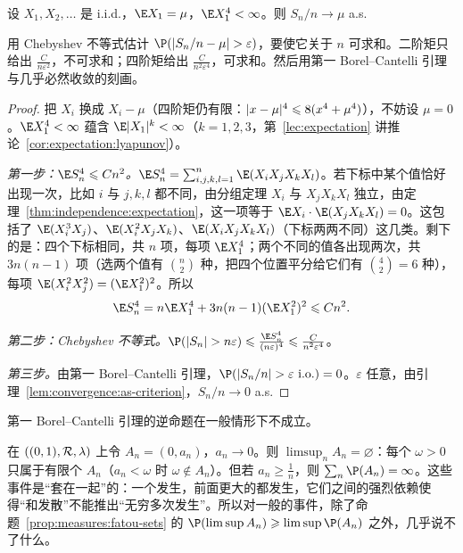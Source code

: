 \begin{theorem}[四阶矩的强大数定律]\label{thm:borel-cantelli:fourth-moment}
设 $X_1,X_2,\dots$ 是 i.i.d.，$\E X_1=\mu$，$\E X_1^4<\infty$。则 $S_n/n\to\mu$ a.s.
\end{theorem}

\begin{remark}[证明思路]
用 Chebyshev 不等式估计 $\P(\abs{S_n/n-\mu}>\varepsilon)$，要使它关于 $n$ 可求和。二阶矩只给出 $\frac C{n\varepsilon^2}$，不可求和；四阶矩给出 $\frac C{n^2\varepsilon^4}$，可求和。然后用第一 Borel--Cantelli 引理与几乎必然收敛的刻画。
\end{remark}

\begin{proof}
把 $X_i$ 换成 $X_i-\mu$（四阶矩仍有限：$\lvert x-\mu\rvert^4\leqslant8(x^4+\mu^4)$），不妨设 $\mu=0$。$\E X_1^4<\infty$ 蕴含 $\E\abs{X_1}^k<\infty$（$k=1,2,3$，第~\ref{lec:expectation} 讲推论~\ref{cor:expectation:lyapunov}）。

\emph{第一步：$\E S_n^4\leqslant Cn^2$。}$\E S_n^4=\sum_{i,j,k,l=1}^n\E(X_iX_jX_kX_l)$。若下标中某个值恰好出现一次，比如 $i$ 与 $j,k,l$ 都不同，由分组定理 $X_i$ 与 $X_jX_kX_l$ 独立，由定理~\ref{thm:independence:expectation}，这一项等于 $\E X_i\cdot \E(X_jX_kX_l)=0$。这包括了 $\E(X_i^3X_j)$、$\E(X_i^2X_jX_k)$、$\E(X_iX_jX_kX_l)$（下标两两不同）这几类。剩下的是：四个下标相同，共 $n$ 项，每项 $\E X_1^4$；两个不同的值各出现两次，共 $3n(n-1)$ 项（选两个值有 $\binom n2$ 种，把四个位置平分给它们有 $\binom42=6$ 种），每项 $\E(X_i^2X_j^2)=(\E X_1^2)^2$。所以
\[
\E S_n^4=n\E X_1^4+3n(n-1)(\E X_1^2)^2\leqslant Cn^2 .
\]

\emph{第二步：Chebyshev 不等式。}$\P(\abs{S_n}>n\varepsilon)\leqslant\frac{\E S_n^4}{(n\varepsilon)^4}\leqslant\frac C{n^2\varepsilon^4}$。

\emph{第三步。}由第一 Borel--Cantelli 引理，$\P(\abs{S_n/n}>\varepsilon\ \text{i.o.})=0$。$\varepsilon$ 任意，由引理~\ref{lem:convergence:as-criterion}，$S_n/n\to0$ a.s.
\end{proof}

第一 Borel--Cantelli 引理的逆命题在一般情形下不成立。

\begin{example}\label{ex:borel-cantelli:no-converse}
在 $((0,1),\mathcal{R},\lambda)$ 上令 $A_n=(0,a_n)$，$a_n\to0$。则 $\limsup_nA_n=\varnothing$：每个 $\omega>0$ 只属于有限个 $A_n$（$a_n<\omega$ 时 $\omega\notin A_n$）。但若 $a_n\geqslant\frac1n$，则 $\sum_n\P(A_n)=\infty$。这些事件是“套在一起”的：一个发生，前面更大的都发生，它们之间的强烈依赖使得“和发散”不能推出“无穷多次发生”。所以对一般的事件，除了命题~\ref{prop:measures:fatou-sets} 的 $\P(\limsup A_n)\geqslant\limsup \P(A_n)$ 之外，几乎说不了什么。
\end{example}

